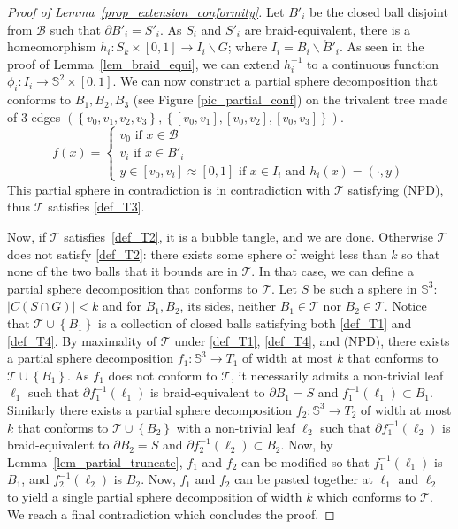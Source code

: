 \documentclass[11pt,a4paper]{article}
\newcommand\ens[1]{\left\{ #1 \right\}}
\newcommand{\Sp}{\mathbb S}
\newcommand{\tand}{\text{ and }}
\newcommand{\T}{\mathcal{T}}
\newcommand{\B}{\mathcal{B}}
\begin{document}
\begin{proof}[Proof of Lemma~\ref{prop_extension_conformity}]
Let $B'_i$ be the closed ball disjoint from $\B$ such that $\partial B'_i = S'_i$. As $S_i$ and $S'_i$ are braid-equivalent, there is a homeomorphism $h_i : S_k \times [0,1]  \rightarrow I_i \smallsetminus G$; where $I_i = B_i \smallsetminus \mathring B'_i$. As seen in the proof of Lemma~\ref{lem_braid_equi}, we can extend $h^{-1}_i$ to a continuous function $ \phi_i : I_i \rightarrow \Sp^2 \times [0,1]$. We can now construct a partial sphere decomposition that conforms to $ B_1,B_2,B_3$ (see Figure \ref{pic_partial_conf}) on the trivalent tree made of $3$ edges $(\ens{v_0,v_1,v_2,v_3}, \ens{[v_0,v_1],[v_0,v_2],[v_0,v_3]})$.  
\begin{equation*}
f(x) =
\left\lbrace
\begin{array}{l}
v_0 \text{ if } x \in \B\\
v_i \text{ if } x \in B'_i\\
y \in [v_0,v_i] \approx [0,1] \text{ if } x \in I_i \tand h_i (x) = (\cdot,y)
\end{array}
\right.
\end{equation*}
This partial sphere in contradiction is in contradiction with $\T$ satisfying (NPD), thus $\T$ satisfies \ref{def_T3}.

Now, if $\T$ satisfies~\ref{def_T2}, it is a bubble tangle, and we are
done. Otherwise $\T$ does not satisfy \ref{def_T2}: there exists some
sphere of weight less than $k$ so that none of the two
balls that it bounds are in $\T$. In that case, we can define a partial
sphere decomposition that conforms to $\T$. Let $S$ be such a sphere
in $\Sp^3$: $|C(S \cap G)| < k$ and for $B_1,B_2$, its sides, neither
$B_1 \in \T$ nor $B_2 \in \T$. Notice that $\T \cup \ens{B_1}$ is a
collection of closed balls satisfying both \ref{def_T1} and
\ref{def_T4}. By maximality of $\T$ under \ref{def_T1}, \ref{def_T4},
and (NPD), there exists a partial sphere decomposition $f_1 : \Sp^3
\rightarrow T_1$ of width at most $k$ that conforms to $\T \cup
\ens{B_1}$. As $f_1$ does not conform to $\T$, it necessarily admits a
non-trivial leaf $\ell_1$ such that $\partial f_1^{-1} (\ell_1)$ is
braid-equivalent to $\partial B_1 = S$ and $f_1^{-1}(\ell_1) \subset B_1$. Similarly there exists a
partial sphere decomposition $f_2: \Sp^3 \rightarrow T_2$ of width at
most $k$ that conforms to $\T \cup \ens{B_2}$ with a non-trivial leaf
$\ell_2$ such that $\partial f_1^{-1} (\ell_2)$ is braid-equivalent to
$\partial B_2 = S$ and $\partial f_2^{-1}(\ell_2) \subset B_2$. Now, by Lemma~\ref{lem_partial_truncate}, $f_1$
and $f_2$ can be modified so that $f_1^{-1}(\ell_1)$ is $B_1$, and
$f_2^{-1}(\ell_2)$ is $B_2$. Now, $f_1$ and $f_2$ can be pasted
together at $\ell_1$ and $\ell_2$ to yield a single partial sphere
decomposition of width $k$ which conforms to $\T$. We reach a final contradiction
which concludes the proof.
\end{proof}
\end{document}
